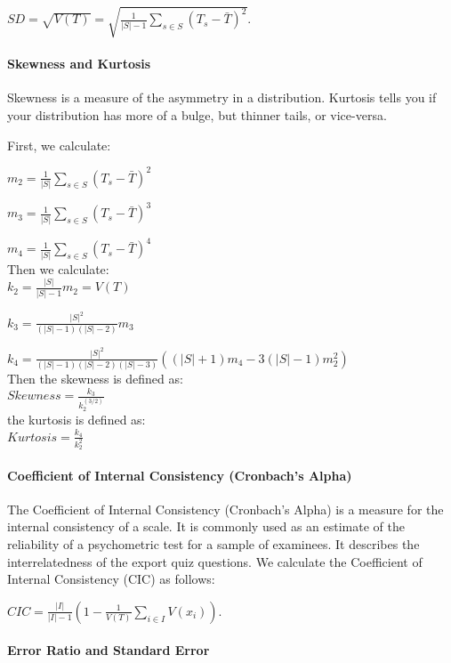 \documentclass[12pt]{report}
\begin{document}
$SD = \sqrt{V(T)} = \sqrt{\frac{1}{|S| - 1}\sum\limits_{s\in S}(T_s - \bar{T})^2}$.

\paragraph{Skewness and Kurtosis}
Skewness is a measure of the asymmetry in a distribution. Kurtosis tells you if your distribution has more of a bulge, but thinner tails, or vice-versa. 

First, we calculate:

$m_2=\frac{1}{|S|}\sum\limits_{s\in S}{(T_s - \bar{T})^2}$

$m_3=\frac{1}{|S|}\sum\limits_{s\in S}{(T_s - \bar{T})^3}$

$m_4=\frac{1}{|S|}\sum\limits_{s\in S}{(T_s - \bar{T})^4}$\\

Then we calculate:\\

$k_2 = \frac{|S|}{|S| - 1}m_2 = V(T)$

$k_3 = \frac{|S|^2}{(|S|-1)(|S|-2)} m_3$

$k_4 = \frac{|S|^2}{(|S|-1)(|S|-2)(|S|-3)}\left((|S|+1)m_4-3(|S|-1)m_2^2\right)$\\

Then the skewness is defined as:\\

 $Skewness = \frac{k_3}{k_2^(3/2)}$\\

the kurtosis is defined as:\\

 $Kurtosis = \frac{k_4}{k_2^2}$


\paragraph{Coefficient of Internal Consistency (Cronbach's Alpha)}
The Coefficient of Internal Consistency (Cronbach's Alpha) is a measure for the internal consistency of a scale. It is commonly used as an estimate of the reliability of a psychometric test for a sample of examinees. It describes the  interrelatedness of the export quiz questions. We calculate the Coefficient of Internal Consistency (CIC) as follows:

$CIC=\frac{|I|}{|I|-1}\left(1-\frac{1}{V(T)}\sum\limits_{i\in I}V(x_i)\right)$.


\paragraph{Error Ratio and Standard Error}
\end{document}
